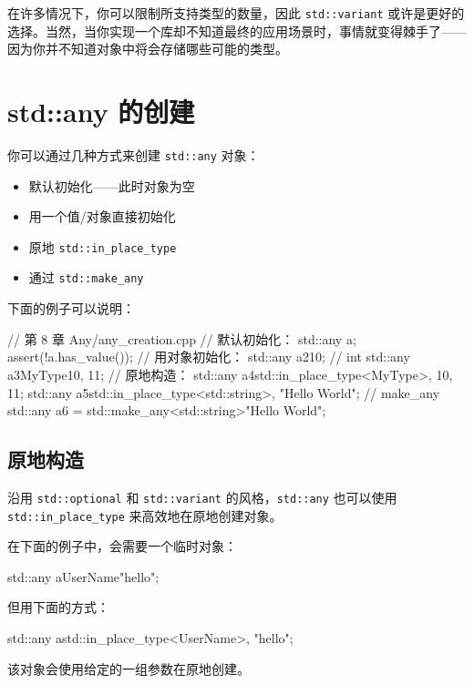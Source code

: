 在许多情况下，你可以限制所支持类型的数量，因此 \texttt{std::variant} 或许是更好的选择。当然，当你实现一个库却不知道最终的应用场景时，事情就变得棘手了——因为你并不知道对象中将会存储哪些可能的类型。


\section{std::any 的创建}

你可以通过几种方式来创建 \texttt{std::any} 对象：
\begin{itemize}
\item 默认初始化——此时对象为空
\item 用一个值/对象直接初始化
\item 原地 \texttt{std::in\_place\_type}
\item 通过 \texttt{std::make\_any}
\end{itemize}

下面的例子可以说明：

\begin{codebox}[cpp]
// 第 8 章 Any/any_creation.cpp
// 默认初始化：
std::any a;
assert(!a.has_value());
// 用对象初始化：
std::any a2{10}; // int
std::any a3{MyType{10, 11}};
// 原地构造：
std::any a4{std::in_place_type<MyType>, 10, 11};
std::any a5{std::in_place_type<std::string>, "Hello World"};
// make_any
std::any a6 = std::make_any<std::string>{"Hello World"};
\end{codebox}


\subsection{原地构造}

沿用 \texttt{std::optional} 和 \texttt{std::variant} 的风格，\texttt{std::any} 也可以使用 \texttt{std::in\_place\_type} 来高效地在原地创建对象。


在下面的例子中，会需要一个临时对象：

\begin{codebox}[cpp]
std::any a{UserName{"hello"}};
\end{codebox}

但用下面的方式：

\begin{codebox}[cpp]
std::any a{std::in_place_type<UserName>, "hello"};
\end{codebox}

该对象会使用给定的一组参数在原地创建。

